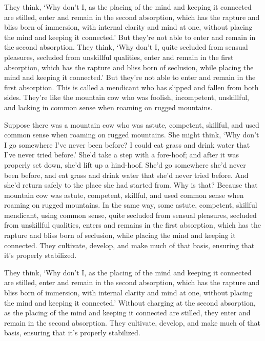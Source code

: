 \documentclass[12pt,openany]{book}%
\begin{document}
They think, ‘Why don’t I, as the placing of the mind and keeping it connected are stilled, enter and remain in the second absorption, which has the rapture and bliss born of immersion, with internal clarity and mind at one, without placing the mind and keeping it connected.’ But they’re not able to enter and remain in the second absorption. They think, ‘Why don’t I, quite secluded from sensual pleasures, secluded from unskillful qualities, enter and remain in the first absorption, which has the rapture and bliss born of seclusion, while placing the mind and keeping it connected.’ But they’re not able to enter and remain in the first absorption. This is called a mendicant who has slipped and fallen from both sides. They’re like the mountain cow who was foolish, incompetent, unskillful, and lacking in common sense when roaming on rugged mountains. 

Suppose there was a mountain cow who was astute, competent, skillful, and used common sense when roaming on rugged mountains. She might think, ‘Why don’t I go somewhere I’ve never been before? I could eat grass and drink water that I’ve never tried before.’ She’d take a step with a fore-hoof; and after it was properly set down, she’d lift up a hind-hoof. She’d go somewhere she’d never been before, and eat grass and drink water that she’d never tried before. And she’d return safely to the place she had started from. Why is that? Because that mountain cow was astute, competent, skillful, and used common sense when roaming on rugged mountains. In the same way, some astute, competent, skillful mendicant, using common sense, quite secluded from sensual pleasures, secluded from unskillful qualities, enters and remains in the first absorption, which has the rapture and bliss born of seclusion, while placing the mind and keeping it connected. They cultivate, develop, and make much of that basis, ensuring that it’s properly stabilized. 

They think, ‘Why don’t I, as the placing of the mind and keeping it connected are stilled, enter and remain in the second absorption, which has the rapture and bliss born of immersion, with internal clarity and mind at one, without placing the mind and keeping it connected.’ Without charging at the second absorption, as the placing of the mind and keeping it connected are stilled, they enter and remain in the second absorption. They cultivate, develop, and make much of that basis, ensuring that it’s properly stabilized. 
\end{document}
